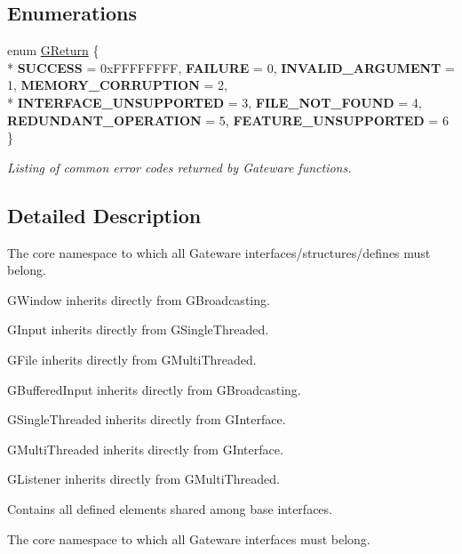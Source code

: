 \subsection*{Enumerations}
\begin{DoxyCompactItemize}
\item 
enum \hyperlink{namespaceGW_a67a839e3df7ea8a5c5686613a7a3de21}{G\+Return} \{ \\*
{\bfseries S\+U\+C\+C\+E\+SS} = 0x\+F\+F\+F\+F\+F\+F\+FF, 
{\bfseries F\+A\+I\+L\+U\+RE} = 0, 
{\bfseries I\+N\+V\+A\+L\+I\+D\+\_\+\+A\+R\+G\+U\+M\+E\+NT} = 1, 
{\bfseries M\+E\+M\+O\+R\+Y\+\_\+\+C\+O\+R\+R\+U\+P\+T\+I\+ON} = 2, 
\\*
{\bfseries I\+N\+T\+E\+R\+F\+A\+C\+E\+\_\+\+U\+N\+S\+U\+P\+P\+O\+R\+T\+ED} = 3, 
{\bfseries F\+I\+L\+E\+\_\+\+N\+O\+T\+\_\+\+F\+O\+U\+ND} = 4, 
{\bfseries R\+E\+D\+U\+N\+D\+A\+N\+T\+\_\+\+O\+P\+E\+R\+A\+T\+I\+ON} = 5, 
{\bfseries F\+E\+A\+T\+U\+R\+E\+\_\+\+U\+N\+S\+U\+P\+P\+O\+R\+T\+ED} = 6
 \}\hypertarget{namespaceGW_a67a839e3df7ea8a5c5686613a7a3de21}{}\label{namespaceGW_a67a839e3df7ea8a5c5686613a7a3de21}
\begin{DoxyCompactList}\small\item\em Listing of common error codes returned by Gateware functions. \end{DoxyCompactList}
\end{DoxyCompactItemize}


\subsection{Detailed Description}
The core namespace to which all Gateware interfaces/structures/defines must belong. 

G\+Window inherits directly from G\+Broadcasting.

G\+Input inherits directly from G\+Single\+Threaded.

G\+File inherits directly from G\+Multi\+Threaded.

G\+Buffered\+Input inherits directly from G\+Broadcasting.

G\+Single\+Threaded inherits directly from G\+Interface.

G\+Multi\+Threaded inherits directly from G\+Interface.

G\+Listener inherits directly from G\+Multi\+Threaded.

Contains all defined elements shared among base interfaces.

The core namespace to which all Gateware interfaces must belong.


